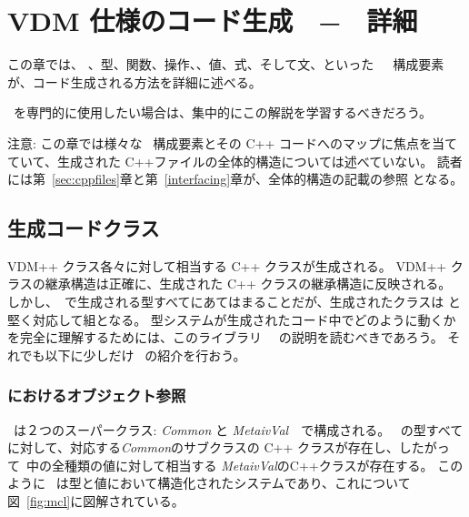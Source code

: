 \documentclass[\pformat,12pt]{jarticle}
\begin{document}
\section{VDM 仕様のコード生成　−　詳細}\label{sec:relation}

この章では、 、型、関数、操作、、値、式、そして文、といった　\VDM\ 構成要素が、コード生成される方法を詳細に述べる。

 \tcg\ を専門的に使用したい場合は、集中的にこの解説を学習するべきだろう。

注意: この章では様々な \VDM\ 構成要素とその C++ コードへのマップに焦点を当てていて、生成された C++ファイルの全体的構造については述べていない。
読者には第~\ref{sec:cppfiles}章と第~\ref{interfacing}章が、全体的構造の記載の参照 となる。


\subsection{生成コードクラス}\label{sec:classes}



VDM++ クラス各々に対して相当する C++ クラスが生成される。
 VDM++ クラスの継承構造は正確に、生成された C++ クラスの継承構造に反映される。
しかし、\tcg　で生成される型すべてにあてはまることだが、生成されたクラスは \MCL と堅く対応して組となる。
型システムが生成されたコード中でどのように動くかを完全に理解するためには、このライブラリ \libmancite　の説明を読むべきであろう。  
それでも以下に少しだけ \MCL\ の紹介を行おう。

\subsubsection{\MCL におけるオブジェクト参照}

 \MCL\ は２つのスーパークラス: {\em Common} と {\em  MetaivVal}　で構成される。 
 \VDM\ の型すべてに対して、対応する{\em Common}のサブクラスの C++ クラスが存在し、したがって\VDM\ 中の全種類の値に対して相当する {\em MetaivVal}のC++クラスが存在する。
このように \MCL\ は型と値において構造化されたシステムであり、これについて 図~\ref{fig:mcl}に図解されている。
\end{document}
